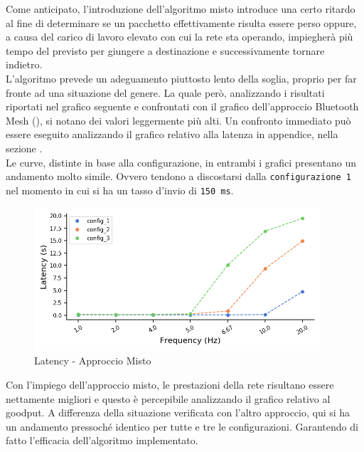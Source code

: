 \noindent Come anticipato, l'introduzione dell'algoritmo misto introduce una certo ritardo al fine di determinare se un pacchetto effettivamente risulta essere perso oppure, a causa del carico di lavoro elevato con cui la rete sta operando, impiegherà più tempo del previsto per giungere a destinazione e successivamente tornare indietro.\\
L'algoritmo prevede un adeguamento piuttosto lento della soglia, proprio per far fronte ad una situazione del genere. La quale però, analizzando i risultati riportati nel grafico seguente e confrontati con il grafico dell'approccio Bluetooth Mesh (), si notano dei valori leggermente più alti. Un confronto immediato può essere eseguito analizzando il grafico relativo alla latenza in appendice, nella sezione .\\
Le curve, distinte in base alla configurazione, in entrambi i grafici presentano un andamento molto simile. Ovvero tendono a discostarsi dalla \texttt{configurazione 1} nel momento in cui si ha un tasso d'invio di \texttt{150 ms}.

\begin{figure}[hbt!]
    \centering
    \includegraphics[width = 0.95\textwidth]{images/graphs/ble_wifi_latency.png}
    \caption{Latency - Approccio Misto}
    \label{graph:ble_wifi_latency}
\end{figure}

\noindent Con l'impiego dell'approccio misto, le prestazioni della rete risultano essere nettamente migliori e questo è percepibile analizzando il grafico relativo al goodput. A differenza della situazione verificata con l'altro approccio, qui si ha un andamento pressoché identico per tutte e tre le configurazioni. Garantendo di fatto l'efficacia dell'algoritmo implementato.

